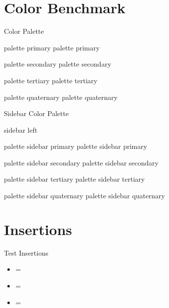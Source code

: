 \section{Color Benchmark}

\begin{frame}{Color Palette}
\begin{beamercolorbox}[sep=6pt]{palette primary}
palette primary
\end{beamercolorbox}\smallskip
\begin{beamercolorbox}[sep=6pt]{palette secondary}
palette secondary
\end{beamercolorbox}\smallskip
\begin{beamercolorbox}[sep=6pt]{palette tertiary}
palette tertiary
\end{beamercolorbox}\smallskip
\begin{beamercolorbox}[sep=6pt]{palette quaternary}
palette quaternary
\end{beamercolorbox}
\end{frame}

\begin{frame}{Sidebar Color Palette}

\begin{beamercolorbox}[colsep*=8pt,vmode]{sidebar left}
\begin{beamercolorbox}[sep=6pt]{palette sidebar primary}
palette sidebar primary
\end{beamercolorbox}\smallskip
\begin{beamercolorbox}[sep=6pt]{palette sidebar secondary}
palette sidebar secondary
\end{beamercolorbox}\smallskip
\begin{beamercolorbox}[sep=6pt]{palette sidebar tertiary}
palette sidebar tertiary
\end{beamercolorbox}\smallskip
\begin{beamercolorbox}[sep=6pt]{palette sidebar quaternary}
palette sidebar quaternary
\end{beamercolorbox}
\end{beamercolorbox}
\end{frame}

\section{Insertions}

\begin{frame}{Test Insertions}
\begin{itemize}[<+->]
  \item \string\insertpagenumber=\insertpagenumber
  \item \string\insertsection=\insertsection
  \item \string\insertframetitle=\insertframetitle
\end{itemize}
\end{frame}

\endinput